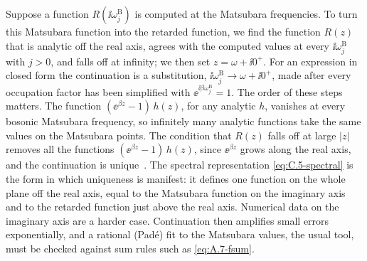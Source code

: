 Suppose a function $R(\ii\omega^{\mathrm{B}}_j)$ is computed at the Matsubara frequencies. To turn this Matsubara function into the retarded function, we find the function $R(z)$ that is analytic off the real axis, agrees with the computed values at every $\ii\omega^{\mathrm{B}}_j$ with $j > 0$, and falls off at infinity; we then set $z = \omega + \ii0^+$. For an expression in closed form the continuation is a substitution, $\ii\omega^{\mathrm{B}}_j \to \omega + \ii0^+$, made after every occupation factor has been simplified with $\ee^{\ii\beta\omega^{\mathrm{B}}_j} = 1$. The order of these steps matters. The function $(\ee^{\beta z} - 1)\,h(z)$, for any analytic $h$, vanishes at every bosonic Matsubara frequency, so infinitely many analytic functions take the same values on the Matsubara points. The condition that $R(z)$ falls off at large $|z|$ removes all the functions $(\ee^{\beta z} - 1)\,h(z)$, since $\ee^{\beta z}$ grows along the real axis, and the continuation is unique~\cite{baym1961determination}. The spectral representation \cref{eq:C.5-spectral} is the form in which uniqueness is manifest: it defines one function on the whole plane off the real axis, equal to the Matsubara function on the imaginary axis and to the retarded function just above the real axis. Numerical data on the imaginary axis are a harder case. Continuation then amplifies small errors exponentially, and a rational (Pad\'e) fit to the Matsubara values, the usual tool, must be checked against sum rules such as \cref{eq:A.7-fsum}.
